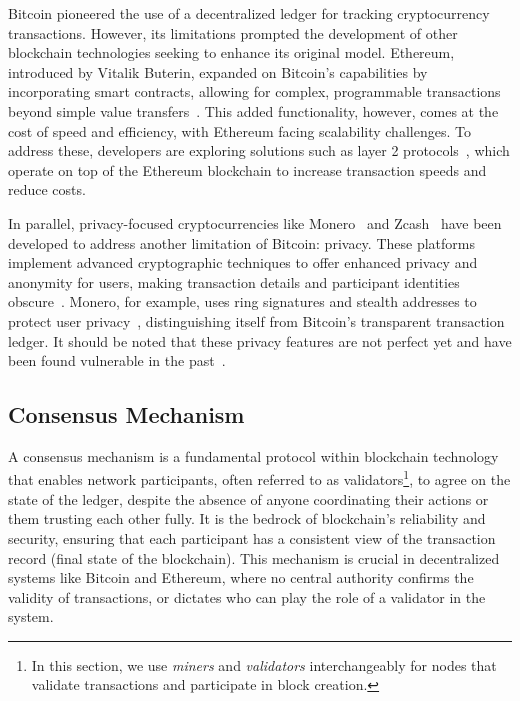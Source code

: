 Bitcoin pioneered the use of a decentralized ledger for tracking cryptocurrency transactions. However, its limitations prompted the development of other blockchain technologies seeking to enhance its original model. Ethereum, introduced by Vitalik Buterin, expanded on Bitcoin’s capabilities by incorporating smart contracts, allowing for complex, programmable transactions beyond simple value transfers~\cite{buterin2014next}. This added functionality, however, comes at the cost of speed and efficiency, with Ethereum facing scalability challenges. To address these, developers are exploring solutions such as layer 2 protocols~\cite{clark2018sok:online,optimismgithub,kalodner2018arbitrum}, which operate on top of the Ethereum blockchain to increase transaction speeds and reduce costs.

In parallel, privacy-focused cryptocurrencies like Monero~\cite{monero} and Zcash~\cite{hopwood2016zcash} have been developed to address another limitation of Bitcoin: privacy. These platforms implement advanced cryptographic techniques to offer enhanced privacy and anonymity for users, making transaction details and participant identities obscure~\cite{van2013cryptonote, miers2013zerocoin}. Monero, for example, uses ring signatures and stealth addresses to protect user privacy~\cite{cryptoeprint2015}, distinguishing itself from Bitcoin's transparent transaction ledger. It should be noted that these privacy features are not perfect yet and have been found vulnerable in the past~\cite{kumar2017traceability,miller2017empirical}.



\subsection{Consensus Mechanism}\label{consensus_mechanism}
A consensus mechanism is a fundamental protocol within blockchain technology that enables network participants, often referred to as validators\footnote{In this section, we use \textit{miners} and \textit{validators} interchangeably for nodes that validate transactions and participate in block creation.}, to agree on the state of the ledger, despite the absence of anyone coordinating their actions or them trusting each other fully. It is the bedrock of blockchain's reliability and security, ensuring that each participant has a consistent view of the transaction record (final state of the blockchain). This mechanism is crucial in decentralized systems like Bitcoin and Ethereum, where no central authority confirms the validity of transactions, or dictates who can play the role of a validator in the system. 

